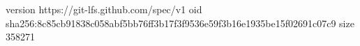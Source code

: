 version https://git-lfs.github.com/spec/v1
oid sha256:8c85cb91838c058abf5bb76ff3b17f3f9536e59f3b16e1935be15f02691c07c9
size 358271
